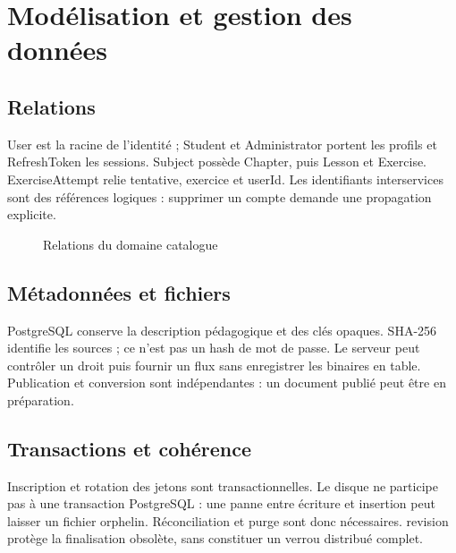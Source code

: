 \chapter{Modélisation et gestion des données}
\section{Relations}
User est la racine de l’identité ; Student et Administrator portent les profils et RefreshToken les sessions. Subject possède Chapter, puis Lesson et Exercise. ExerciseAttempt relie tentative, exercice et userId. Les identifiants interservices sont des références logiques : supprimer un compte demande une propagation explicite.

\begin{figure}[ht]\centering{}\caption{Relations du domaine catalogue}\end{figure}
\section{Métadonnées et fichiers}
PostgreSQL conserve la description pédagogique et des clés opaques. SHA-256 identifie les sources ; ce n’est pas un hash de mot de passe. Le serveur peut contrôler un droit puis fournir un flux sans enregistrer les binaires en table. Publication et conversion sont indépendantes : un document publié peut être en préparation.

\section{Transactions et cohérence}
Inscription et rotation des jetons sont transactionnelles. Le disque ne participe pas à une transaction PostgreSQL : une panne entre écriture et insertion peut laisser un fichier orphelin. Réconciliation et purge sont donc nécessaires. revision protège la finalisation obsolète, sans constituer un verrou distribué complet.

